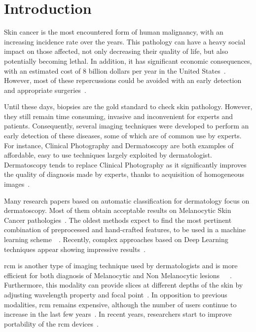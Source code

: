 \section{Introduction}
\label{sec:intro}
Skin cancer is the most encountered form of human malignancy, with an increasing incidence rate over the years. This pathology can have a heavy social impact on those affected, not only decreasing their quality of life, but also potentially becoming lethal. In addition, it has significant economic consequences, with an estimated cost of 8 billion dollars per year in the United States~\cite{Farberg2017a}. However, most of these repercussions could be avoided with an early detection and appropriate surgeries~\cite{Farberg2017a}.\par
Until these days, biopsies are the gold standard to check skin pathology. However, they still remain time consuming, invasive and inconvenient for experts and patients. Consequently, several imaging techniques were developed to perform an early detection of these diseases, some of which are of common use by experts. For instance, Clinical Photography and Dermatoscopy are both examples of affordable, easy to use techniques largely exploited by dermatologist. Dermatoscopy tends to replace Clinical Photography as it significantly improves the quality of diagnosis made by experts, thanks to acquisition of homogeneous images~\cite{Sinz2017}.\par
Many research papers based on automatic classification for dermatology focus on dermatoscopy. Most of them obtain acceptable results on Melanocytic Skin Cancer pathologies~\cite{Iyatomi2010}. The oldest methods expect to find the most pertinent combination of preprocessed and hand-crafted features, to be used in a machine learning scheme~\cite{Rastgoo2015}~\cite{Pathan2018}. Recently, complex approaches based on Deep Learning techniques appear showing impressive results~\cite{Esteva2017}.\par
\ac{rcm} is another type of imaging technique used by dermatologists and is more efficient for both diagnosis of Melanocytic and Non Melanocytic lesions~\cite{Gerger2006}~\cite{Guitera2009}~\cite{Haroon2017}. Furthermore, this modality can provide slices at different depths of the skin by adjusting wavelength property and focal point~\cite{Kolm2012}. In opposition to previous modalities, \ac{rcm} remains expensive, although the number of users continue to increase in the last few years~\cite{Batta2015}. In recent years, researchers start to improve portability of the \ac{rcm} devices~\cite{Freeman2018}.\par 

